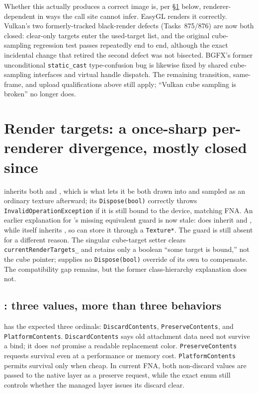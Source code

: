 Whether this actually produces a correct image is, per \S\ref{sec:rendertargets} below,
renderer-dependent in ways the call site cannot infer. EasyGL renders it correctly. Vulkan's
two formerly-tracked black-render defects (Tasks~875/876) are now both closed: clear-only
targets enter the used-target list, and the original cube-sampling regression test passes
repeatedly end to end, although the exact incidental change that retired the second defect was
not bisected. BGFX's former unconditional \texttt{static\_cast} type-confusion bug is likewise
fixed by shared cube-sampling interfaces and virtual handle dispatch. The remaining transition,
same-frame, and upload qualifications above still apply; ``Vulkan cube sampling is broken'' no
longer does.

\section[Render-target divergences]{Render targets: a once-sharp per-renderer divergence,
mostly closed since}
\label{sec:rendertargets}

 inherits both  and ,
which is what lets it be both drawn into and sampled as an ordinary texture afterward; its
\texttt{Dispose(bool)} correctly throws \texttt{InvalidOperationException} if it is still
bound to the device, matching FNA. An earlier explanation for
's missing equivalent guard is now stale:
 does inherit  and
, while  itself inherits , so
 can store it through a \texttt{Texture*}. The guard is still
absent for a different reason. The singular cube-target setter clears
\texttt{currentRenderTargets\_} and retains only a boolean ``some target is bound,'' not the
cube pointer;  supplies no \texttt{Dispose(bool)} override of its
own to compensate. The compatibility gap remains, but the former class-hierarchy explanation
does not.

\subsection{: three values, more than three behaviors}
\label{sec:rendertarget-usage-contract}

 has the expected three ordinals:
\texttt{DiscardContents}, \texttt{PreserveContents}, and \texttt{PlatformContents}.
\texttt{DiscardContents} says old attachment data need not survive a bind; it does
\emph{not} promise a readable replacement color. \texttt{PreserveContents} requests survival
even at a performance or memory cost. \texttt{PlatformContents} permits survival only when
cheap. In current FNA, both non-discard values are passed to the native layer as a preserve
request, while the exact enum still controls whether the managed layer issues its discard
clear.

